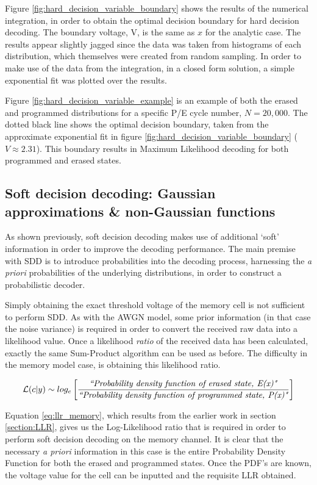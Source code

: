 \documentclass[11pt]{article}
\numberwithin{equation}{subsection}
\begin{document}
Figure \ref{fig:hard_decision_variable_boundary} shows the results of the numerical integration, in order to obtain the optimal decision boundary for hard decision decoding. The boundary voltage, V, is the same as $x$ for the analytic case. The results appear slightly jagged since the data was taken from histograms of each distribution, which themselves were created from random sampling. In order to make use of the data from the integration, in a closed form solution, a simple exponential fit was plotted over the results. 

Figure \ref{fig:hard_decision_variable_example} is an example of both the erased and programmed distributions for a specific P/E cycle number, $N=20,000$. The dotted black line shows the optimal decision boundary, taken from the approximate exponential fit in figure \ref{fig:hard_decision_variable_boundary} ($V \approx 2.31$). This boundary results in Maximum Likelihood decoding for both programmed and erased states.

\subsection{Soft decision decoding: Gaussian approximations \& non-Gaussian functions}
As shown previously, soft decision decoding makes use of additional `soft' information in order to improve the decoding performance. The main premise with SDD is to introduce probabilities into the decoding process, harnessing the \textit{a priori} probabilities of the underlying distributions, in order to construct a probabilistic decoder.

Simply obtaining the exact threshold voltage of the memory cell is not sufficient to perform SDD. As with the AWGN model, some prior information (in that case the noise variance) is required in order to convert the received raw data into a likelihood value. Once a likelihood \textit{ratio} of the received data has been calculated, exactly the same Sum-Product algorithm can be used as before. The difficulty in the memory model case, is obtaining this likelihood ratio.

\begin{equation} \label{eq:llr_memory}
\mathcal{L}(c|y) \sim log_e \left[ \dfrac{\text{\textit{``Probability density function of erased state, E(x)"}}}{\text{\textit{``Probability density function of programmed state, P(x)"}}} \right]
\end{equation}

Equation \ref{eq:llr_memory}, which results from the earlier work in section \ref{section:LLR}, gives us the Log-Likelihood ratio that is required in order to perform soft decision decoding on the memory channel. It is clear that the necessary \textit{a priori} information in this case is the entire Probability Density Function for both the erased and programmed states. Once the PDF's are known, the voltage value for the cell can be inputted and the requisite LLR obtained.
\end{document}
